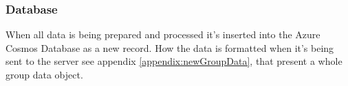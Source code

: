 

\subsubsection{Database}\label{sec:implServerGroupCreationDatabase}
When all data is being prepared and processed it's inserted into the Azure Cosmos Database as a new record.
How the data is formatted when it's being sent to the server see appendix \ref{appendix:newGroupData}, that present a whole group data object.
